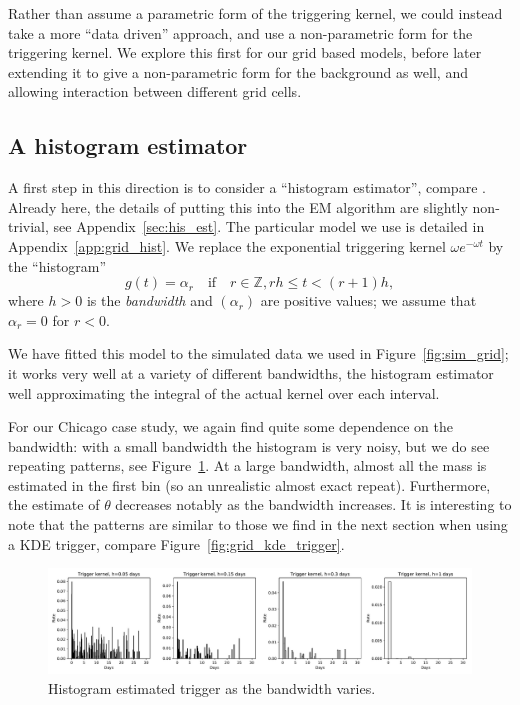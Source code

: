 \documentclass[twoside,a4paper]{article}
\theoremstyle{plain}
\theoremstyle{definition}
\begin{document}
Rather than assume a parametric form of the triggering kernel, we could instead take a more
``data driven'' approach, and use a non-parametric form for the triggering kernel.  We
explore this first for our grid based models, before later extending it to give a non-parametric
form for the background as well, and allowing interaction between different grid cells.




\subsection{A histogram estimator}

A first step in this direction is to consider a ``histogram estimator'', compare
\cite[Section~2.2]{sil}.  Already here, the details of putting this into the EM algorithm
are slightly non-trivial, see Appendix~\ref{sec:his_est}.  The particular model we use
is detailed in Appendix~\ref{app:grid_hist}.  We replace the exponential triggering kernel
$\omega e^{-\omega t}$ by the ``histogram''
\[ g(t) = \alpha_r \quad\text{if}\quad r\in\mathbb Z, rh \leq t < (r+1)h, \]
where $h>0$ is the \emph{bandwidth} and $(\alpha_r)$ are positive values; we assume
that $\alpha_r = 0$ for $r<0$.

We have fitted this model to the simulated data we used in Figure~\ref{fig:sim_grid};
it works very well at a variety of different bandwidths, the histogram estimator well
approximating the integral of the actual kernel over each interval.

For our Chicago case study, we again find quite some
dependence on the bandwidth: with a small bandwidth the histogram is very noisy, but we
do see repeating patterns, see Figure~\ref{fig:south_trigger}.
At a large bandwidth, almost all the mass is estimated in the
first bin (so an unrealistic almost exact repeat).  Furthermore, the estimate of $\theta$
decreases notably as the bandwidth increases.
It is interesting to note that the patterns are similar to those we find in the next
section when using a KDE trigger, compare Figure~\ref{fig:grid_kde_trigger}.

\begin{figure}
  \includegraphics[width=\textwidth]{../notebooks/south_trigger.pdf}
  \caption{Histogram estimated trigger as the bandwidth varies.}
  \label{fig:south_trigger}
\end{figure}
\end{document}
